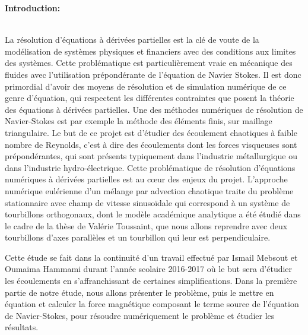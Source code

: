 \documentclass[a4paper,12pt,titlepage]{report}
\begin{document}
\tableofcontents

\newpage




\textbf{\Huge Introduction:}
\\
\\
\begin{onehalfspace}
La résolution d'équations à dérivées partielles est la clé de voute de la modélisation de systèmes physiques et financiers avec des conditions aux limites des systèmes. Cette problématique est particulièrement vraie en mécanique des fluides avec l'utilisation prépondérante de l'équation de Navier Stokes. Il est donc primordial d'avoir des moyens de résolution et de simulation numérique de ce genre d'équation, qui respectent les différentes contraintes que posent la théorie des équations à dérivées partielles. Une des méthodes numériques de résolution de Navier-Stokes est par exemple la méthode des éléments finis, sur maillage triangulaire. 
\newline
Le but de ce projet est d'étudier des écoulement chaotiques à faible nombre de Reynolds, c'est à dire des écoulements dont les forces visqueuses sont prépondérantes, qui sont présents typiquement dans l'industrie métallurgique ou dans l'industrie hydro-électrique. Cette problématique de résolution d'équations numériques à dérivées partielles est au cœur des enjeux du projet.
\newline
\newline
L'approche numérique eulérienne d'un mélange par advection chaotique traite du problème stationnaire avec champ de vitesse sinusoïdale qui correspond à un système de tourbillons orthogonaux, dont le modèle académique analytique a été étudié dans le cadre de la thèse de Valérie Toussaint, que nous allons reprendre avec deux tourbillons d'axes parallèles et un tourbillon qui leur est perpendiculaire.

Cette étude se fait dans la continuité d'un travail effectué par Ismail Mebsout et Oumaima Hammami durant l'année scolaire 2016-2017 où le but sera d'étudier les écoulements en s'affranchissant de certaines simplifications.
Dans la première partie de notre étude, nous allons présenter le problème, puis le mettre en équation et calculer la force magnétique composant le terme source de l'équation de Navier-Stokes, pour résoudre numériquement le problème et étudier les résultats.


\end{onehalfspace}
\end{document}

